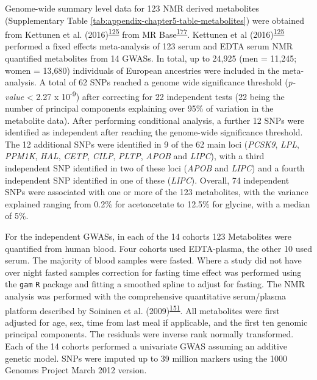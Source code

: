 \documentclass[11pt,twoside]{bristolthesis}
\begin{document}
Genome-wide summary level data for 123 NMR derived metabolites (Supplementary Table \ref{tab:appendix-chapter5-table-metabolites}) were obtained from Kettunen et al. (2016)\textsuperscript{\protect\hyperlink{ref-Kettunen2016}{125}} from MR Base\textsuperscript{\protect\hyperlink{ref-Hemani2018}{177}}. Kettunen et al (2016)\textsuperscript{\protect\hyperlink{ref-Kettunen2016}{125}} performed a fixed effects meta-analysis of 123 serum and EDTA serum NMR quantified metabolites from 14 GWASs. In total, up to 24,925 (men = 11,245; women = 13,680) individuals of European ancestries were included in the meta-analysis. A total of 62 SNPs reached a genome wide significance threshold (\emph{p-value} \textless{} 2.27 x 10\textsuperscript{-9}) after correcting for 22 independent tests (22 being the number of principal components explaining over 95\% of variation in the metabolite data). After performing conditional analysis, a further 12 SNPs were identified as independent after reaching the genome-wide significance threshold. The 12 additional SNPs were identified in 9 of the 62 main loci (\emph{PCSK9}, \emph{LPL}, \emph{PPM1K}, \emph{HAL}, \emph{CETP}, \emph{CILP}, \emph{PLTP}, \emph{APOB} and \emph{LIPC}), with a third independent SNP identified in two of these loci (\emph{APOB} and \emph{LIPC}) and a fourth independent SNP identified in one of these (\emph{LIPC}). Overall, 74 independent SNPs were associated with one or more of the 123 metabolites, with the variance explained ranging from 0.2\% for acetoacetate to 12.5\% for glycine, with a median of 5\%.

For the independent GWASs, in each of the 14 cohorts 123 Metabolites were quantified from human blood. Four cohorts used EDTA-plasma, the other 10 used serum. The majority of blood samples were fasted. Where a study did not have over night fasted samples correction for fasting time effect was performed using the \texttt{gam} \texttt{R} package and fitting a smoothed spline to adjust for fasting. The NMR analysis was performed with the comprehensive quantitative serum/plasma platform described by Soininen et al. (2009)\textsuperscript{\protect\hyperlink{ref-Soininen2009}{151}}. All metabolites were first adjusted for age, sex, time from last meal if applicable, and the first ten genomic principal components. The residuals were inverse rank normally transformed. Each of the 14 cohorts performed a univariate GWAS assuming an additive genetic model. SNPs were imputed up to 39 million markers using the 1000 Genomes Project March 2012 version.
\end{document}
